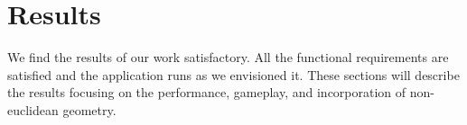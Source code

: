 \chapter{Results}\label{ch:results}
We find the results of our work satisfactory.
All the functional requirements are satisfied and the application runs as we envisioned it.
These sections will describe the results focusing on the performance, gameplay, and incorporation of non-euclidean geometry.



